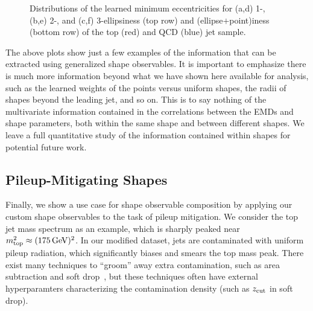 \documentclass[letterpaper,11pt]{article}
\def\GeV{\text{GeV}}
\begin{document}
 


\begin{figure*}[tp]
    \centering
    \vspace{1pt}
    \caption{
        Distributions of the learned minimum eccentricities for (a,d) 1-, (b,e) 2-, and (c,f) 3-ellipsiness (top row) and (ellipse$+$point)iness (bottom row) of the top (red) and QCD (blue) jet sample. 
        }
    \label{fig:eccentricity_ellipse}
\end{figure*}


The above plots show just a few examples of the information that can be extracted using generalized shape observables. It is important to emphasize there is much more information beyond what we have shown here available for analysis, such as the learned weights of the points versus uniform shapes, the radii of shapes beyond the leading jet, and so on. This is to say nothing of the multivariate information contained in the correlations between the EMDs and shape parameters, both within the same shape and between different shapes. We leave a full quantitative study of the information contained within shapes for potential future work. 



\subsection{Pileup-Mitigating Shapes}\label{sec:pileup}

Finally, we show a use case for shape observable composition by applying our custom shape observables to the task of pileup mitigation. We consider the top jet mass spectrum as an example, which is sharply peaked near $m_{\rm top}^2 \approx (175\,\GeV)^2$.  In our modified dataset, jets are contaminated with uniform pileup radiation, which significantly biases and smears the top mass peak.  There exist many techniques to ``groom'' away extra contamination, such as area subtraction and soft drop~\cite{Cacciari_2008, Cacciari_2008_2, Soyez:2012hv, Larkoski:2014wba, Dasgupta_2013}, but these techniques often have external hyperparamters characterizing the contamination density (such as $z_{\rm cut}$ in soft drop).
\end{document}
